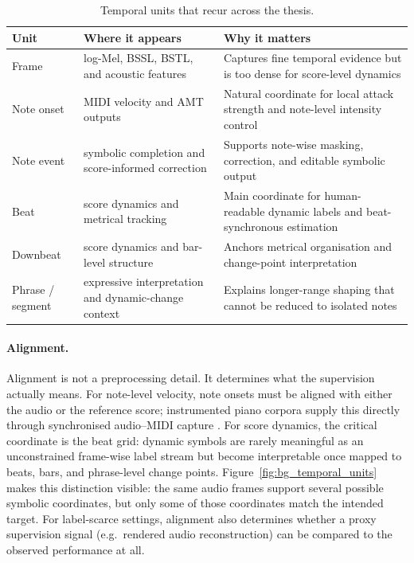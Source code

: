 \begin{table}[!htbp]
\centering
\caption{Temporal units that recur across the thesis.}
\label{tab:bg_temporal_units}
\small
\setlength{\tabcolsep}{5pt}
\renewcommand{\arraystretch}{1.18}
\begin{tabularx}{\textwidth}{
>{\raggedright\arraybackslash}p{}
>{\raggedright\arraybackslash}p{}
>{\raggedright\arraybackslash}X
}
\toprule
\textbf{Unit} & \textbf{Where it appears} & \textbf{Why it matters} \\
\midrule
Frame & log-Mel, BSSL, BSTL, and acoustic features & Captures fine temporal evidence but is too dense for score-level dynamics \\
Note onset & MIDI velocity and AMT outputs & Natural coordinate for local attack strength and note-level intensity control \\
Note event & symbolic completion and score-informed correction & Supports note-wise masking, correction, and editable symbolic output \\
Beat & score dynamics and metrical tracking & Main coordinate for human-readable dynamic labels and beat-synchronous estimation \\
Downbeat & score dynamics and bar-level structure & Anchors metrical organisation and change-point interpretation \\
Phrase / segment & expressive interpretation and dynamic-change context & Explains longer-range shaping that cannot be reduced to isolated notes \\
\bottomrule
\end{tabularx}
\end{table}


\paragraph{Alignment.}
Alignment is not a preprocessing detail. It determines what the supervision actually means. For note-level velocity, note onsets must be aligned with either the audio or the reference score; instrumented piano corpora supply this directly through synchronised audio--MIDI capture \cite{hawthorne2019maestro}. For score dynamics, the critical coordinate is the beat grid: dynamic symbols are rarely meaningful as an unconstrained frame-wise label stream but become interpretable once mapped to beats, bars, and phrase-level change points. Figure~\ref{fig:bg_temporal_units} makes this distinction visible: the same audio frames support several possible symbolic coordinates, but only some of those coordinates match the intended target. For label-scarce settings, alignment also determines whether a proxy supervision signal (e.g.\ rendered audio reconstruction) can be compared to the observed performance at all.

